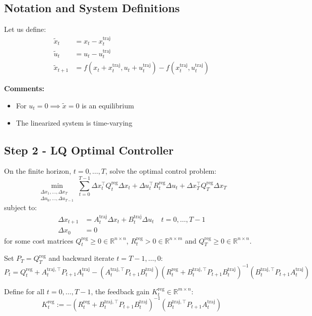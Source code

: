 \documentclass[openany]{book}
\theoremstyle{definition}
\theoremstyle{remark}
\begin{document}
\subsection{Notation and System Definitions}
Let us define:
\begin{align*}
    \tilde{x}_t &= x_t - x_t^{\text{traj}} \\
    \tilde{u}_t &= u_t - u_t^{\text{traj}} \\
    \tilde{x}_{t+1} &= f(x_t + x_t^{\text{traj}}, u_t + u_t^{\text{traj}}) - f(x_t^{\text{traj}}, u_t^{\text{traj}})
\end{align*}

\textbf{Comments:}
\begin{itemize}
    \item For $u_t = 0 \implies \tilde{x} = 0$ is an equilibrium
    \item The linearized system is time-varying
\end{itemize}

\subsection{Step 2 - LQ Optimal Controller}
On the finite horizon, $t = 0,\ldots,T$, solve the optimal control problem:
\[
    \min_{\substack{\Delta x_1,\ldots,\Delta x_T \\ \Delta u_0,\ldots,\Delta u_{T-1}}} \sum_{t=0}^{T-1} \Delta x_t^\top Q_t^{\text{reg}}\Delta x_t + \Delta u_t^\top R_t^{\text{reg}}\Delta u_t + \Delta x_T^\top Q_T^{\text{reg}}\Delta x_T
\]
subject to:
\begin{align*}
    \Delta x_{t+1} &= A_t^{\text{traj}}\Delta x_t + B_t^{\text{traj}}\Delta u_t \quad t = 0,\ldots,T-1 \\
    \Delta x_0 &= 0
\end{align*}
for some cost matrices $Q_t^{\text{reg}} \geq 0 \in \mathbb{R}^{n\times n}$, $R_t^{\text{reg}} > 0 \in \mathbb{R}^{n\times m}$ and $Q_T^{\text{reg}} \geq 0 \in \mathbb{R}^{n\times n}$.

Set $P_T = Q_T^{\text{reg}}$ and backward iterate $t = T-1,\ldots,0$:
\begin{equation}
    P_t = Q_t^{\text{reg}} + A_t^{\text{traj},\top}P_{t+1}A_t^{\text{traj}} - (A_t^{\text{traj},\top}P_{t+1}B_t^{\text{traj}})(R_t^{\text{reg}} + B_t^{\text{traj},\top}P_{t+1}B_t^{\text{traj}})^{-1}(B_t^{\text{traj},\top}P_{t+1}A_t^{\text{traj}})
\end{equation}

Define for all $t = 0,\ldots,T-1$, the feedback gain $K_t^{\text{reg}} \in \mathbb{R}^{m\times n}$:
\[
    K_t^{\text{reg}} := -(R_t^{\text{reg}} + B_t^{\text{traj},\top}P_{t+1}B_t^{\text{traj}})^{-1}(B_t^{\text{traj},\top}P_{t+1}A_t^{\text{traj}})
\]
\end{document}
